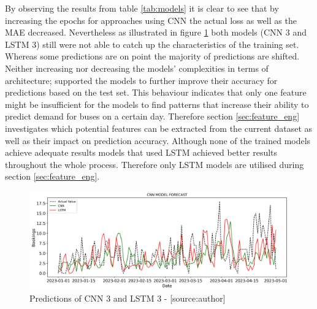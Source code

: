 By observing the results from table \ref{tab:models} it is clear to see that by increasing the epochs for approaches using CNN the actual loss as well as the MAE decreased. Nevertheless as illustrated in figure \ref{fig:combined_model} both models (CNN 3 and LSTM 3) still were not able to catch up the characteristics of the training set. Whereas some predictions are on point the majority of predictions are shifted. Neither increasing nor decreasing the models' complexities in terms of architecture; supported the models to further improve their accuracy for predictions based on the test set.
This behaviour indicates that only one feature might be insufficient for the models to find patterns that increase their ability to predict demand for buses on a certain day.
Therefore section \ref{sec:feature_eng} investigates which potential features can be extracted from the current dataset as well as their impact on prediction accuracy. Although none of the trained models achieve adequate results models that used LSTM achieved better results throughout the whole process. Therefore only LSTM models are utilised during section \ref{sec:feature_eng}.
\begin{figure}[H]
	\centering
		\includegraphics[width=14cm]{images/combined_prediction}
	\caption{Predictions of CNN 3 and LSTM 3 - [source:author]}
	\label{fig:combined_model}
\end{figure}

